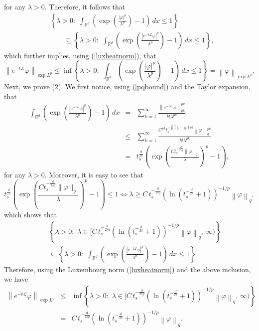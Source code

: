 \documentclass[a4paper,11pt]{amsart}
\renewcommand\eqref[1]{(\ref{#1})} %
\numberwithin{equation}{section}
\theoremstyle{plain}
\theoremstyle{definition}
\begin{document}
for any $\lambda>0$. Therefore, it follows that
\begin{align*}
&\left\{\lambda>0:\,\,\int_{\mathbb{R}^d}\left(\exp\left(\frac{|\varphi|^p}{\lambda^p}\right)-1\right)\,dx\leq 1\right\} \\& \quad\quad\subseteq \left\{\lambda>0:\,\,\int_{\mathbb{R}^d}\left(\exp\left(\frac{|e^{-t\mathcal{L}} \varphi|^p}{\lambda^p}\right)-1\right)\,dx\leq 1\right\},
\end{align*}
which further implies, using \eqref{luxheatnorm}, that
$$
\left\|e^{-t\mathcal{L}} \varphi\right\|_{\exp L^p}\leq \inf\left\{\lambda>0:\,\,\int_{\mathbb{R}^d}\left(\exp\left(\frac{|\varphi|^p}{\lambda^p}\right)-1\right)\,dx\leq 1\right\}=\left\|\varphi\right\|_{\exp L^p}.
$$
Next, we prove (2).  We first notice, using \eqref{pqbound}  and the Taylor expansion, that
\begin{eqnarray*}
\int_{\mathbb{R}^d}\left(\exp\left(\frac{|e^{-t\mathcal{L}} \varphi|^p}{\lambda^p}\right)-1\right)\,dx&=&\sum_{k=1}^{\infty}\frac{\left\|e^{-t\mathcal{L}} \varphi\right\|_{pk}^{pk}}{k!\lambda^{pk}}\\
&\leq& \sum_{k=1}^{\infty}\frac{C^{pk}t_s^{-\frac{d}{2s}(\frac{1}{q}-\frac{1}{pk})pk}\left\|\varphi\right\|_{q}^{pk}}{k!\lambda^{pk}}\\
&=&t_s^{\frac{d}{2s}}\left(\exp\left(\frac{C t_s^{-\frac{d}{2s q}}\|\varphi\|_q}{\lambda}\right)^p-1\right),
\end{eqnarray*}
for any $\lambda>0$. Moreover, it is easy to see that
$$t_s^{\frac{d}{2s}}\left(\exp\left(\frac{C t_s^{-\frac{d}{2 s q}}\|\varphi\|_q}{\lambda}\right)^p-1\right)\leq 1\Longleftrightarrow \lambda\geq C\,t_s^{-\frac{d}{2s q}}\left(\ln( t_s^{-\frac{d}{2 s}}+1)\right)^{-1/p}\left\|\varphi\right\|_{q},$$
which shows that
\begin{eqnarray*}
&{}&\left\{\lambda>0 :\,\, \lambda\in \Big[ C\,t_s^{-\frac{d}{2 s q}}\left(\ln( t_s^{-\frac{d}{2 s}}+1)\right)^{-1/p}\left\|\varphi\right\|_{q}, \,\infty \Big)\right\}\\
&{}&\subseteq \left\{\lambda>0 :\,\, \int_{\mathbb{R}^d}\left(\exp\left(\frac{|e^{-t\mathcal{L}} \varphi|^p}{\lambda^p}\right)-1\right)\,dx\leq 1\right\}.
\end{eqnarray*}
Therefore, using the Luxembourg norm \eqref{luxheatnorm} and the above inclusion, we have
\begin{eqnarray*}
\left\|e^{-t\mathcal{L}} \varphi\right\|_{\exp L^p}&\leq&\inf \left\{\lambda>0 :\,\, \lambda\in \Big[ C\,t_s^{-\frac{d}{2s q}}\left(\ln( t_s^{-\frac{d}{2s}}+1)\right)^{-1/p}\left\|\varphi\right\|_{q}, \,\infty \Big)\right\}\\
&=&C\,t_s^{-\frac{d}{2s q}}\left(\ln( t_s^{-\frac{d}{2s}}+1)\right)^{-1/p}\left\|\varphi\right\|_{q}.
\end{eqnarray*}
\end{document}

